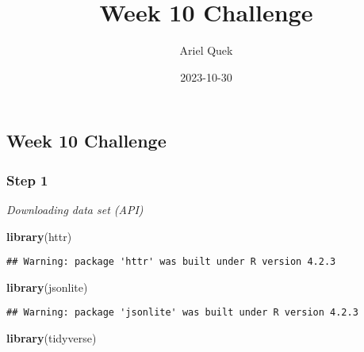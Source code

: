\documentclass[
]{article}
\title{Week 10 Challenge}
\author{Ariel Quek}
\date{2023-10-30}
\newenvironment{Shaded}{\begin{snugshade}}{\end{snugshade}}
\newcommand{\AttributeTok}[1]{\textcolor[rgb]{0.13,0.29,0.53}{#1}}
\newcommand{\ConstantTok}[1]{\textcolor[rgb]{0.56,0.35,0.01}{#1}}
\newcommand{\FunctionTok}[1]{\textcolor[rgb]{0.13,0.29,0.53}{\textbf{#1}}}
\newcommand{\NormalTok}[1]{#1}
\newcommand{\SpecialCharTok}[1]{\textcolor[rgb]{0.81,0.36,0.00}{\textbf{#1}}}
\begin{document}
\maketitle

\begin{Shaded}
\end{Shaded}

\hypertarget{week-10-challenge}{%
\subsection{Week 10 Challenge}\label{week-10-challenge}}

\hypertarget{step-1}{%
\subsubsection{Step 1}\label{step-1}}

\emph{Downloading data set (API)}

\begin{Shaded}
\begin{Highlighting}[]
\FunctionTok{library}\NormalTok{(httr)}
\end{Highlighting}
\end{Shaded}

\begin{verbatim}
## Warning: package 'httr' was built under R version 4.2.3
\end{verbatim}

\begin{Shaded}
\begin{Highlighting}[]
\FunctionTok{library}\NormalTok{(jsonlite)}
\end{Highlighting}
\end{Shaded}

\begin{verbatim}
## Warning: package 'jsonlite' was built under R version 4.2.3
\end{verbatim}

\begin{Shaded}
\begin{Highlighting}[]
\FunctionTok{library}\NormalTok{(tidyverse)}
\end{Highlighting}
\end{Shaded}
\end{document}
